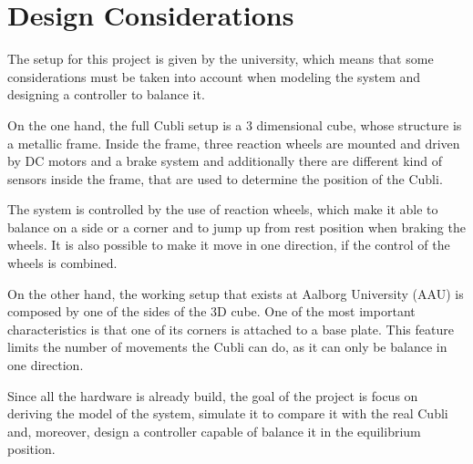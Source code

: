 \chapter{Design Considerations}

The setup for this project is given by the university, which means that some considerations must be taken into account when modeling the system and designing a controller to balance it.

On the one hand, the full Cubli setup is a 3 dimensional cube, whose structure is a metallic frame. Inside the frame, three reaction wheels are mounted and driven by DC motors and a brake system and additionally there are different kind of sensors inside the frame, that are used to determine the position of the Cubli.

The system is controlled by the use of reaction wheels, which make it able to balance on a side or a corner and to jump up from rest position when braking the wheels. It is also possible to make it move in one direction, if the control of the wheels is combined.%

On the other hand, the working setup that exists at Aalborg University (AAU) is composed by one of the sides of the 3D cube. One of the most important characteristics is that one of its corners is attached to a base plate. This feature limits the number of movements the Cubli can do, as it can only be balance in one direction.

Since all the hardware is already build, the goal of the project is focus on deriving the model of the system, simulate it to compare it with the real Cubli and, moreover, design a controller capable of balance it in the equilibrium position.

